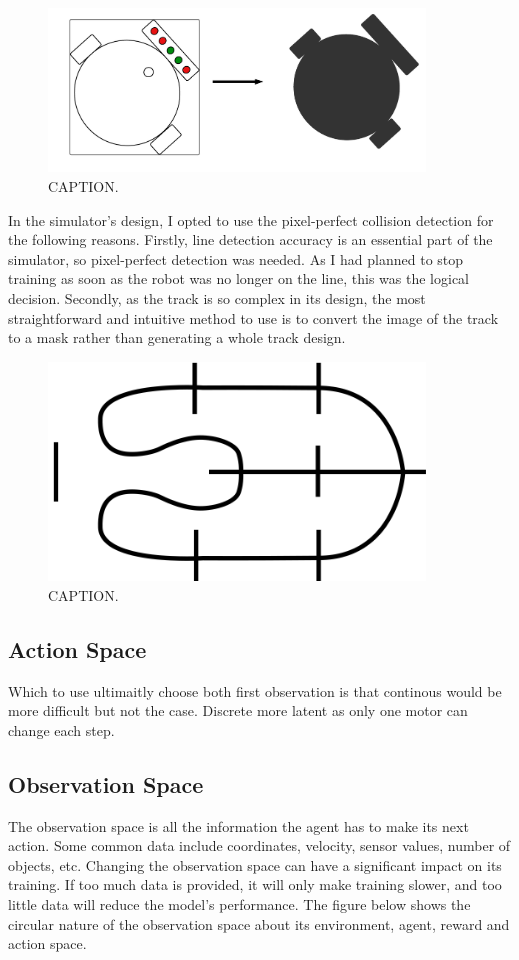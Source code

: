 \documentclass[12pt]{article}
\begin{document}
 \begin{figure}[H]
 \label{fig:}
 \centering
 \includegraphics[width=10cm]{imgs/MasksCollision.png}
 \caption{CAPTION.}
 \end{figure}

In the simulator's design, I opted to use the pixel-perfect collision detection for the following reasons. Firstly, line detection accuracy is an essential part of the simulator, so pixel-perfect detection was needed. As I had planned to stop training as soon as the robot was no longer on the line, this was the logical decision. Secondly, as the track is so complex in its design, the most straightforward and intuitive method to use is to convert the image of the track to a mask rather than generating a whole track design.


 \begin{figure}[H]
 \label{fig:}
 \centering
 \includegraphics[width=10cm]{imgs/Track.png}
 \caption{CAPTION.}
 \end{figure}

\subsection{Action Space}
Which to use ultimaitly choose both first observation is that continous would be more difficult but not the case. Discrete more latent as only one motor can change each step. 

\subsection{Observation Space}
The observation space is all the information the agent has to make its next action. Some common data include coordinates, velocity, sensor values, number of objects, etc. Changing the observation space can have a significant impact on its training. If too much data is provided, it will only make training slower, and too little data will reduce the model's performance. The figure below shows the circular nature of the observation space about its environment, agent, reward and action space.
\end{document}
